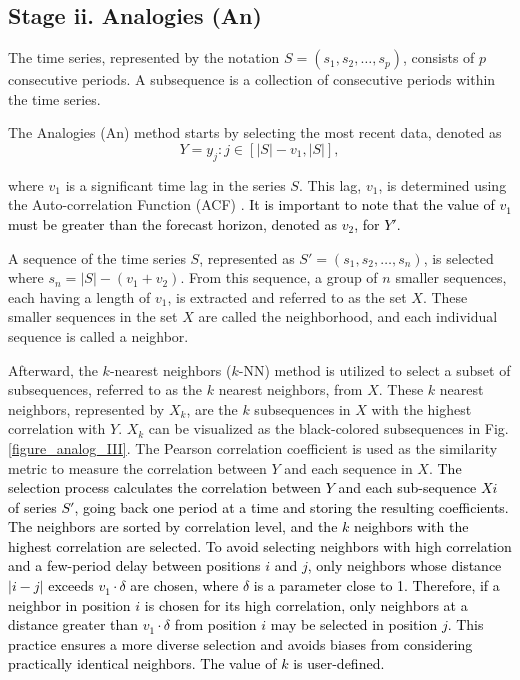 \documentclass[journal, twoside]{IEEEtran}
\begin{document}
\subsection*{Stage ii. Analogies (An)}
\label{sec:an_method}

The time series, represented by the notation $S = (s_1, s_2, \ldots, s_p)$, consists of $p$ consecutive periods. A subsequence is a collection of consecutive periods within the time series.

The Analogies (An) method starts by selecting the most recent data, denoted as
\begin{equation}
Y ={y_j:j \in [|S|-v_1,|S|]},    
\end{equation}

where $v_1$ is a significant time lag in the series $S$. This lag, $v_1$, is determined using the Auto-correlation Function (ACF) \cite{Box2015}. 
\textcolor{black}{It is important to note that the value of $v_1$ must be greater than the forecast horizon, denoted as $v_2$, for $Y'$.}

A sequence of the time series $S$, represented as $S' = (s_1, s_2, \ldots, s_n)$, is selected where $s_n = |S| - (v_1 + v_2)$. From this sequence, a group of $n$ smaller sequences, each having a length of $v_1$, is extracted and referred to as the set $X$. These smaller sequences in the set $X$ are called the neighborhood, and each individual sequence is called a neighbor.

Afterward, the $k$-nearest neighbors ($k$-NN) method \cite{martinez2019} is utilized to select a subset of subsequences, referred to as the $k$ nearest neighbors, from $X$. These $k$ nearest neighbors, represented by $X_k$, are the $k$ subsequences in $X$ with the highest correlation with $Y$. $X_k$ can be visualized as the black-colored subsequences in Fig. \ref{figure_analog_III}. The Pearson correlation coefficient is used as the similarity metric to measure the correlation between $Y$ and each sequence in $X$. 
\textcolor{black}{The selection process calculates the correlation between $Y$ and each sub-sequence $Xi$ of series $S'$, going back one period at a time and storing the resulting coefficients. The neighbors are sorted by correlation level, and the $k$ neighbors with the highest correlation are selected. To avoid selecting neighbors with high correlation and a few-period delay between positions $i$ and $j$, only neighbors whose distance $|i-j|$ exceeds $v_1\cdot \delta$ are chosen, where $\delta$ is a parameter close to 1. Therefore, if a neighbor in position $i$ is chosen for its high correlation, only neighbors at a distance greater than $v_1\cdot \delta$ from position $i$ may be selected in position $j$.
This practice ensures a more diverse selection and avoids biases from considering practically identical neighbors. The value of $k$ is user-defined.} %
\end{document}
